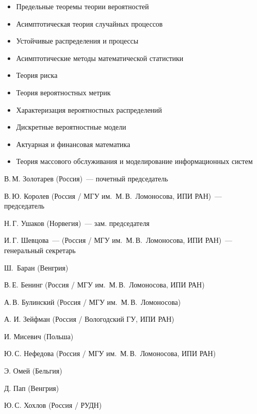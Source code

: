 \vspace*{12pt}

{\centerline{}}
\begin{itemize}
\item  Предельные теоремы теории вероятностей
\item Асимптотическая теория случайных процессов
\item Устойчивые распределения и процессы 
\item Асимптотические методы математической статистики
\item Теория риска
\item Теория вероятностных метрик
\item Характеризация вероятностных распределений
\item Дискретные вероятностные модели
\item  Актуарная и финансовая математика
\item Теория массового обслуживания и моделирование информационных систем
\end{itemize}

\vspace*{6pt}


{\centerline{}}
 
 \vspace*{12pt}

В.\,М. Золотарев (Россия)~--- почетный председатель

В.\,Ю. Королев (Россия / МГУ им.\ М.\,В.~Ломоносова, ИПИ РАН)~--- председатель

Н.\,Г. Ушаков (Норвегия)~--- зам. председателя

И.\,Г. Шевцова~--- (Россия / МГУ им.\ М.\,В.~Ломоносова, ИПИ РАН)~--- генеральный секретарь

Ш.~Баран (Венгрия)

В.\,Е. Бенинг (Россия / МГУ им.\ М.\,В.~Ломоносова, ИПИ РАН)

А.\,В. Булинский (Россия / МГУ им.\ М.\,В.~Ломоносова)

А. И. Зейфман (Россия / Вологодский ГУ, ИПИ РАН)

И. Мисевич (Польша)

Ю.\,С. Нефедова (Россия / МГУ им.\ М.\,В.~Ломоносова, ИПИ РАН)

Э. Омей (Бельгия)

Д. Пап (Венгрия)

Ю.\,С. Хохлов (Россия / РУДН)

